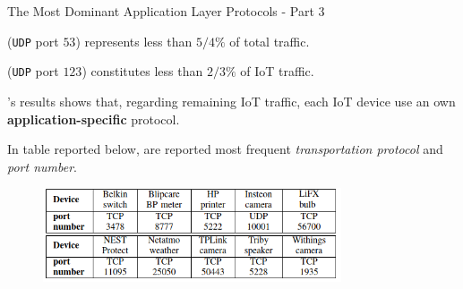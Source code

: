 \documentclass[10pt]{beamer}
\begin{document}
\begin{frame}{The Most Dominant Application Layer Protocols - Part 3}

\begin{description}
\justifying
\item[\texttt{DNS}] (\texttt{UDP} port $53$) represents less than $5/4\%$ of total traffic.

\item[\texttt{NTP}] (\texttt{UDP} port $123$) constitutes less than $2/3\%$ of IoT traffic.

\item[Application specific] \citet{ITPAReport}'s results shows that, regarding remaining IoT traffic, each IoT device use an own \textbf{application-specific} protocol. 

In table reported below, are reported most frequent \textit{transportation protocol} and \textit{port number}.

\begin{figure}
  \includegraphics[width=250pt]{port.png}
\end{figure}

\end{description}

\end{frame} 
\end{document}
